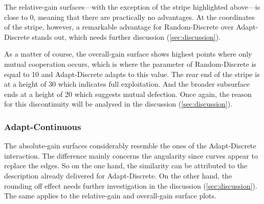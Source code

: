 \documentclass[11pt]{article}
\begin{document}
		The relative-gain surfaces---with the exception of the stripe highlighted above---is close to 0, meaning that there are practically no advantages.
		At the coordinates of the stripe, however, a remarkable advantage for Random-Discrete over Adapt-Discrete stands out, which needs further discussion (\ref{sec:discussion}).

		As a matter of course, the overall-gain surface shows highest points where only mutual cooperation occurs, which is where the parameter of Random-Discrete is equal to 10 and Adapt-Discrete adapts to this value.
		The rear end of the stripe is at a height of 30 which indicates full exploitation.
		And the broader subsurface ends at a height of 20 which suggests mutual defection.
		Once again, the reason for this discontinuity will be analysed in the discussion (\ref{sec:discussion}). 

\subsubsection*{Adapt-Continuous}
		The absolute-gain surfaces considerably resemble the ones of the Adapt-Discrete interaction.
		The difference mainly concerns the angularity since curves appear to replace the edges.
		So on the one hand, the similarity can be attributed to the description already delivered for Adapt-Discrete.
		On the other hand, the rounding off effect needs further investigation in the discussion (\ref{sec:discussion}).
		The same applies to the relative-gain and overall-gain surface plots.\\

	
\end{document}
